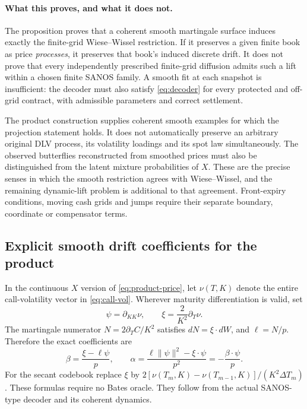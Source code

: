 \documentclass[11pt,a4paper]{article}
\numberwithin{equation}{section}
\theoremstyle{definition}\newtheorem{definition}[theorem]{Definition}
\theoremstyle{remark}\newtheorem{remark}[theorem]{Remark}
\begin{document}
\paragraph{What this proves, and what it does not.}
The proposition proves that a coherent smooth martingale surface induces exactly the finite-grid Wiese--Wissel restriction. If it preserves a given finite book as price \emph{processes}, it preserves that book's induced discrete drift. It does not prove that every independently prescribed finite-grid diffusion admits such a lift within a chosen finite SANOS family. A smooth fit at each snapshot is insufficient: the decoder must also satisfy \eqref{eq:decoder} for every protected and off-grid contract, with admissible parameters and correct settlement.

The product construction supplies coherent smooth examples for which the projection statement holds. It does not automatically preserve an arbitrary original DLV process, its volatility loadings and its spot law simultaneously. The observed butterflies reconstructed from smoothed prices must also be distinguished from the latent mixture probabilities of $X$. These are the precise senses in which the smooth restriction agrees with Wiese--Wissel, and the remaining dynamic-lift problem is additional to that agreement. Front-expiry conditions, moving cash grids and jumps require their separate boundary, coordinate or compensator terms.


\subsection{Explicit smooth drift coefficients for the product}
In the continuous $X$ version of \eqref{eq:product-price}, let $\nu(T,K)$ denote the entire call-volatility vector in \eqref{eq:call-vol}. Wherever maturity differentiation is valid, set
\[
 \psi=\partial_{KK}\nu,\qquad
 \xi=\frac{2}{K^2}\partial_T\nu.
\]
The martingale numerator $N=2\partial_TC/K^2$ satisfies $dN=\xi\cdot dW$, and $\ell=N/p$. Therefore the exact coefficients are
\begin{equation}
 \boxed{\quad
 \beta=\frac{\xi-\ell\psi}{p},\qquad
 \alpha=\frac{\ell\|\psi\|^2-\xi\cdot\psi}{p^2}
        =-\frac{\beta\cdot\psi}{p}.
 \quad}
 \label{eq:explicit-drift}
\end{equation}
For the secant codebook replace $\xi$ by $2[\nu(T_m,K)-\nu(T_{m-1},K)]/(K^2\Delta T_m)$. These formulas require no Bates oracle. They follow from the actual SANOS-type decoder and its coherent dynamics.
\end{document}
